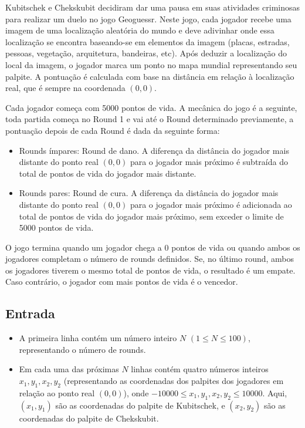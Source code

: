 Kubitschek e Chekskubit decidiram dar uma pausa em suas atividades criminosas para realizar um duelo no jogo Geoguessr. Neste jogo, cada jogador recebe uma imagem de uma localização aleatória do mundo e deve adivinhar onde essa localização se encontra baseando-se em elementos da imagem (placas, estradas, pessoas, vegetação, arquitetura, bandeiras, etc). Após deduzir a localização do local da imagem, o jogador marca um ponto no mapa mundial representando seu palpite. A pontuação é calculada com base na distância em relação à localização real, que é sempre na coordenada \((0, 0)\).

Cada jogador começa com 5000 pontos de vida. A mecânica do jogo é a seguinte, toda partida começa no Round 1 e vai até o Round determinado previamente, a pontuação depois de cada Round é dada da seguinte forma:
\begin{itemize}
    \item Rounds ímpares: Round de dano. A diferença da distância do jogador mais distante do ponto real \((0, 0)\) para o jogador mais próximo é subtraída do total de pontos de vida do jogador mais distante.
    \item Rounds pares: Round de cura. A diferença da distância do jogador mais distante do ponto real \((0, 0)\) para o jogador mais próximo é adicionada ao total de pontos de vida do jogador mais próximo, sem exceder o limite de 5000 pontos de vida.
\end{itemize}

O jogo termina quando um jogador chega a 0 pontos de vida ou quando ambos os jogadores completam o número de rounds definidos. Se, no último round, ambos os jogadores tiverem o mesmo total de pontos de vida, o resultado é um empate. Caso contrário, o jogador com mais pontos de vida é o vencedor.

\subsection*{Entrada}

\begin{itemize}
\item A primeira linha contém um número inteiro \(N\) \((1 \leq N \leq 100)\), representando o número de rounds. 
\item Em cada uma das próximas \(N\) linhas contém quatro números inteiros \(x_1, y_1, x_2, y_2\) (representando as coordenadas dos palpites dos jogadores em relação ao ponto real \((0, 0)\)), onde \(-10000 \leq x_1, y_1, x_2, y_2 \leq 10000\). Aqui, \((x_1, y_1)\) são as coordenadas do palpite de Kubitschek, e \((x_2, y_2)\) são as coordenadas do palpite de Chekskubit.
\end{itemize}

